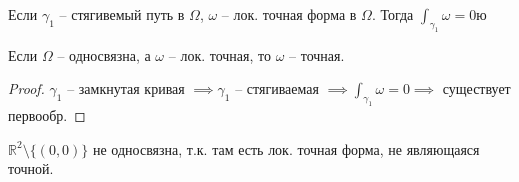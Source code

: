\begin{consequence}
    Если $\gamma_1$ -- стягивемый путь в $\Omega$, $\omega$ -- лок. точная форма в $\Omega$. Тогда $\int_{\gamma_1} {\omega} = 0$ю
\end{consequence}

\begin{theorem}
    Если $\Omega$ -- односвязна, а $\omega$ -- лок. точная, то $\omega$ -- точная.
\end{theorem}
\begin{proof}
    $\gamma_1$ -- замкнутая кривая $\implies \gamma_1$ -- стягиваемая $\implies \int_{\gamma_1} {\omega} = 0 \implies$ существует первообр.
\end{proof}

\begin{remark}
    $\mathbb{R}^2 \setminus \{ (0, 0) \}$ не односвязна, т.к. там есть лок. точная форма, не являющаяся точной.
\end{remark}

